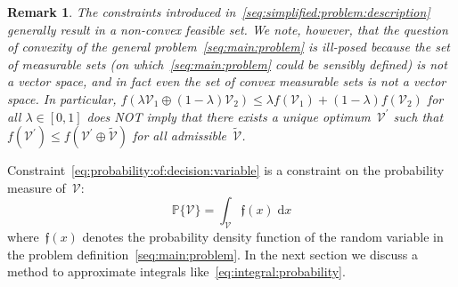 \documentclass[letterpaper, 10pt, conference]{ieeeconf} %
\newtheorem{rem}[thm]{Remark}
\begin{document}
\begin{rem}
The constraints introduced in~\eqref{seq:simplified:problem:description} generally result in a non-convex feasible set.
%
We note, however, that the question of convexity of the general problem~\eqref{seq:main:problem} is ill-posed because the set of measurable sets (on which~\eqref{seq:main:problem} could be sensibly defined) is not a vector space, and in fact even the set of convex measurable sets is not a vector space.
In particular, $f(\lambda\mathcal V_1\oplus(1-\lambda)\mathcal V_2)\leq\lambda f(\mathcal V_1)+(1-\lambda)f(\mathcal V_2)$ for all $\lambda\in[0,1]$ does NOT imply that there exists a unique optimum~$\mathcal V^\prime$ such that $f(\mathcal V^\prime)\leq f(\mathcal V^\prime\oplus\tilde{\mathcal V})$ for all admissible~$\tilde{\mathcal V}$.
%
\end{rem}
%
\noindent Constraint~\eqref{eq:probability:of:decision:variable} is a constraint on the probability measure of~$\mathcal V$:
%
\begin{equation}\label{eq:integral:probability}
	\mathbb P\{\mathcal V\} = \int_{\mathcal V}\mathfrak f(x) \; \mathrm d x
\end{equation}
%
where~$\mathfrak f(x)$ denotes the probability density function of the random variable in the problem definition~\eqref{seq:main:problem}.
%
In the next section we discuss a method to approximate integrals like~\eqref{eq:integral:probability}.
\end{document}

